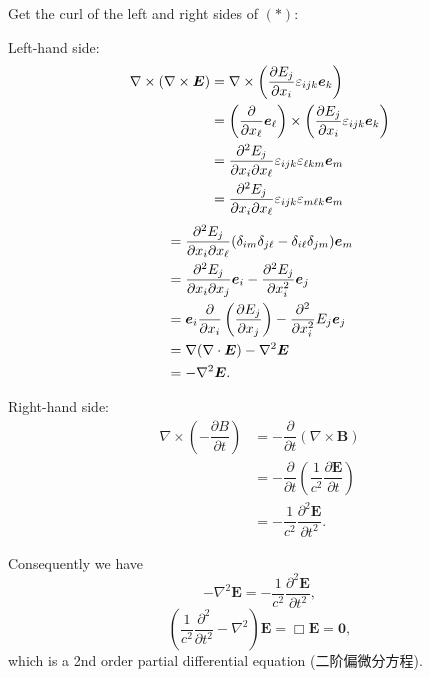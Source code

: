 Get the curl of the left and right sides of \((*)\):

Left-hand side: \begin{align*}
    \nabla \times (\nabla \times \boldsymbol E) & = \nabla \times \left({\partial E_j \over \partial x_i} \varepsilon_{ijk} \boldsymbol e_k \right) \\
    & = \left({\partial \over \partial x_\ell} \boldsymbol e_\ell \right) \times \left({\partial E_j \over \partial x_i} \varepsilon_{ijk} \boldsymbol e_k \right) \\
    & = {\partial^2 E_j \over \partial x_i \partial x_\ell} \varepsilon_{ijk} \varepsilon_{\ell k m} \boldsymbol e_m \\
    & = {\partial^2 E_j \over \partial x_i \partial x_\ell} \varepsilon_{ijk} \varepsilon_{m \ell k} \boldsymbol e_m \\
\end{align*}
\begin{align*}
    & = {\partial^2 E_j \over \partial x_i \partial x_\ell} (\delta_{im}\delta_{j \ell} - \delta_{i \ell}\delta_{jm}) \boldsymbol e_m \\
    & = {\partial^2 E_j \over \partial x_i \partial x_j} \boldsymbol e_i - {\partial^2 E_j \over \partial x_i^2} \boldsymbol e_j \\
    & = \boldsymbol e_i {\partial \over \partial x_i}\left({\partial E_j \over \partial x_j}\right) - {\partial^2 \over \partial x_i^2} E_j \boldsymbol e_j \\
    & = \nabla (\nabla \cdot  \boldsymbol E) - \nabla^2 \boldsymbol E \\
    & = - \nabla^2 \boldsymbol E.
\end{align*}

Right-hand side: \begin{align*}
    \nabla \times \left(-\dfrac{\partial B}{\partial t} \right) & = -\dfrac{\partial}{\partial t} \left( \nabla \times \boldsymbol B \right) \\
    & = -\dfrac{\partial}{\partial t} \left(\dfrac{1}{c^2} \dfrac{\partial \boldsymbol E}{\partial t}\right) \\
    & = - \dfrac{1}{c^2} \dfrac{\partial^2 \boldsymbol E}{\partial t^2}.
\end{align*}

Consequently we have
\[ - \nabla^2 \boldsymbol E = - \dfrac{1}{c^2} \dfrac{\partial^2 \boldsymbol E}{\partial t^2},\]
\[\left(\dfrac{1}{c^2} \dfrac{\partial^2}{\partial t^2}- \nabla^2 \right) \boldsymbol E = \Box \boldsymbol E = \boldsymbol 0,\]
which is a 2nd order partial differential equation (二阶偏微分方程).

